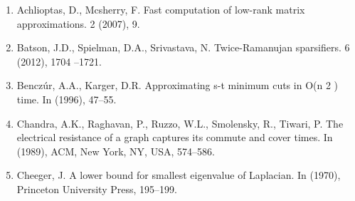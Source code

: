 \documentclass{article}
\begin{document}
\begin{enumerate}[1.]
    \item Achlioptas, D., Mcsherry, F. Fast computation of low-rank matrix
approximations. 2 (2007), 9.

    \item Batson, J.D., Spielman, D.A., Srivastava, N.  Twice-Ramanujan
sparsifiers. 6 (2012), 1704 –1721.

    \item Benczúr, A.A., Karger, D.R.  Approximating s-t minimum cuts in O(n 2
) time. In (1996), 47–55.

    \item Chandra, A.K., Raghavan, P., Ruzzo, W.L., Smolensky, R., Tiwari, P.
The electrical resistance of a graph captures its commute and cover times. In
(1989), ACM, New York, NY, USA, 574–586.

    \item Cheeger, J. A lower bound for smallest eigenvalue of Laplacian. In
(1970), Princeton University Press, 195–199.
\end{enumerate}
\end{document}
